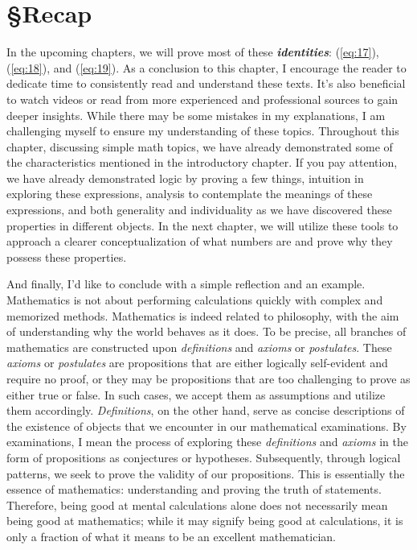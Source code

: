 \section{\S Recap}
In the upcoming chapters, we will prove most of these \textit{\textbf{identities}}: (\ref{eq:17}), (\ref{eq:18}), and (\ref{eq:19}). As a conclusion to this chapter, I encourage the reader to dedicate time to consistently read and understand these texts. It's also beneficial to watch videos or read from more experienced and professional sources to gain deeper insights. While there may be some mistakes in my explanations, I am challenging myself to ensure my understanding of these topics. Throughout this chapter, discussing simple math topics, we have already demonstrated some of the characteristics mentioned in the introductory chapter. If you pay attention, we have already demonstrated logic by proving a few things, intuition in exploring these expressions, analysis to contemplate the meanings of these expressions, and both generality and individuality as we have discovered these properties in different objects. In the next chapter, we will utilize these tools to approach a clearer conceptualization of what numbers are and prove why they possess these properties.

And finally, I'd like to conclude with a simple reflection and an example. Mathematics is not about performing calculations quickly with complex and memorized methods. Mathematics is indeed related to philosophy, with the aim of understanding why the world behaves as it does. To be precise, all branches of mathematics are constructed upon \textit{definitions} and \textit{axioms} or \textit{postulates}. These \textit{axioms} or \textit{postulates} are propositions that are either logically self-evident and require no proof, or they may be propositions that are too challenging to prove as either true or false. In such cases, we accept them as assumptions and utilize them accordingly. \textit{Definitions}, on the other hand, serve as concise descriptions of the existence of objects that we encounter in our mathematical examinations. By examinations, I mean the process of exploring these \textit{definitions} and \textit{axioms} in the form of propositions as conjectures or hypotheses. Subsequently, through logical patterns, we seek to prove the validity of our propositions. This is essentially the essence of mathematics: understanding and proving the truth of statements. Therefore, being good at mental calculations alone does not necessarily mean being good at mathematics; while it may signify being good at calculations, it is only a fraction of what it means to be an excellent mathematician.


